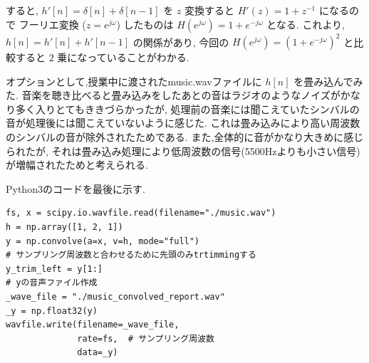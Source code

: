 \documentclass[12pt]{jsarticle}
\begin{document}
        すると, $h'[n] = \delta[n] + \delta[n-1]$ を $z$ 変換すると $H'(z) = 1 + z^{-1}$ になるので
        フーリエ変換 ($z=e^{j\omega}$) したものは $H(e^{j\omega}) = 1 + e^{-j\omega}$ となる.
        これより,$h[n] = h'[n] + h'[n-1]$ の関係があり,
        今回の $H(e^{j\omega}) = (1 + e^{-j\omega})^2$ と比較すると $2$ 乗になっていることがわかる.
        
        オプションとして,授業中に渡されたmusic.wavファイルに $h[n]$ を畳み込んでみた.
        音楽を聴き比べると畳み込みをしたあとの音はラジオのようなノイズがかなり多く入りとてもききづらかったが,
        処理前の音楽には聞こえていたシンバルの音が処理後には聞こえていないように感じた.
        これは畳み込みにより高い周波数のシンバルの音が除外されたためである.
        また,全体的に音がかなり大きめに感じられたが,
        それは畳み込み処理により低周波数の信号(5500Hzよりも小さい信号)が増幅されたためと考えられる.
        
        Python3のコードを最後に示す.
        
        \begin{lstlisting}[basicstyle=\ttfamily\footnotesize, frame=single]
fs, x = scipy.io.wavfile.read(filename="./music.wav")
h = np.array([1, 2, 1])
y = np.convolve(a=x, v=h, mode="full")
# サンプリング周波数と合わせるために先頭のみtrtimmingする
y_trim_left = y[1:]
# yの音声ファイル作成
_wave_file = "./music_convolved_report.wav"
_y = np.float32(y)
wavfile.write(filename=_wave_file,
              rate=fs,  # サンプリング周波数
              data=_y)
				\end{lstlisting}
				
\end{document}
